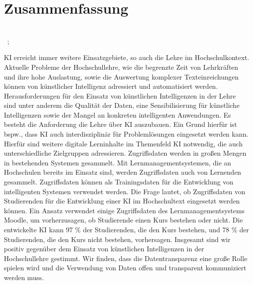 \chapter*{Zusammenfassung}
\begin{center}
  \DocumentThesisTitle
  \\
  \vspace{.3cm}
  \DocumentAuthorPrename\ \DocumentAuthorName ; \DocumentSecondAuthorPrename \DocumentSecondAuthorName
\end{center}
\ac{KI} erreicht immer weitere Einsatzgebiete, so auch die Lehre im Hochschulkontext. Aktuelle Probleme der Hochschullehre, wie die begrenzte Zeit von Lehrkräften und ihre hohe Auslastung, sowie die Auswertung komplexer Texteinreichungen können von künstlicher Intelligenz adressiert und automatisiert werden. Herausforderungen für den Einsatz von künstlichen Intelligenzen in der Lehre sind unter anderem die Qualität der Daten, eine Sensibilisierung für künstliche Intelligenzen sowie der Mangel an konkreten intelligenten Anwendungen. Es besteht die Anforderung die Lehre über \ac{KI} auszubauen. Ein Grund hierfür ist bspw., dass \ac{KI} auch interdisziplinär für Problemlösungen eingesetzt werden kann. Hierfür sind weitere digitale Lerninhalte im Themenfeld \ac{KI} notwendig, die auch unterschiedliche Zielgruppen adressieren. Zugriffsdaten werden in großen Mengen in bestehenden Systemen gesammelt. Mit Lernmanagementsystemen, die an Hochschulen bereits im Einsatz sind, werden Zugriffsdaten auch von Lernenden gesammelt. Zugriffsdaten können als Trainingsdaten für die Entwicklung von intelligenten Systemen verwendet werden. Die Frage lautet, ob Zugriffsdaten von Studierenden für die Entwicklung einer \ac{KI} im Hochschultext eingesetzt werden können. Ein Ansatz verwendet einige Zugriffsdaten des Lernmanagementsystems Moodle, um vorherzusagen, ob Studierende einen Kurs bestehen oder nicht. Die entwickelte \ac{KI} kann 97 \% der Studierenden, die den Kurs bestehen, und 78 \% der Studierenden, die den Kurs nicht bestehen, vorhersagen. Insgesamt sind wir positiv gegenüber dem Einsatz von künstlichen Intelligenzen in der Hochschullehre gestimmt. Wir finden, dass die Datentransparenz eine große Rolle spielen wird und die Verwendung von Daten offen und transparent kommuniziert werden muss.

\newpage

